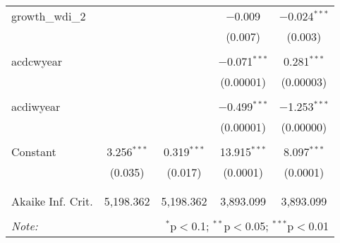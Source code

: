 \begin{table}[!htbp]
\begin{tabular}{@{\extracolsep{5pt}}lcccc}
 growth\_wdi\_2 &  &  & $-$0.009 & $-$0.024$^{***}$ \\ 
  &  &  & (0.007) & (0.003) \\ 
  & & & & \\ 
 acdcwyear &  &  & $-$0.071$^{***}$ & 0.281$^{***}$ \\ 
  &  &  & (0.00001) & (0.00003) \\ 
  & & & & \\ 
 acdiwyear &  &  & $-$0.499$^{***}$ & $-$1.253$^{***}$ \\ 
  &  &  & (0.00001) & (0.00000) \\ 
  & & & & \\ 
 Constant & 3.256$^{***}$ & 0.319$^{***}$ & 13.915$^{***}$ & 8.097$^{***}$ \\ 
  & (0.035) & (0.017) & (0.0001) & (0.0001) \\ 
  & & & & \\ 
\hline \\[-1.8ex] 
Akaike Inf. Crit. & 5,198.362 & 5,198.362 & 3,893.099 & 3,893.099 \\ 
\hline 
\hline \\[-1.8ex] 
\textit{Note:}  & \multicolumn{4}{r}{$^{*}$p$<$0.1; $^{**}$p$<$0.05; $^{***}$p$<$0.01} \\ 
\end{tabular} 
\end{table} 
